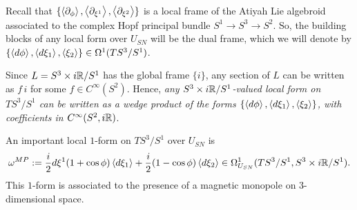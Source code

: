 \begin{example}
\label{exampleComplexHopfConnectionAndCurvature}
Recall that $\{\cl{\partial_\phi}, \cl{\partial_{\xi^1}}, \cl{\partial_{\xi^2}}\}$ is a local frame of the Atiyah Lie algebroid associated to the complex Hopf principal bundle $S^1 \to S^3 \to S^2$. So, the building blocks of any local form over $U_{SN}$ will be the dual frame, which we will denote by $\{\cl{d\phi}, \cl{d\xi_1}, \cl{\xi_2}\} \in \Omega^1(TS^3/S^1)$. 

\noindent Since $L = S^3 \times i\mathbb{R} / S^1$ has the global frame $\{i\}$, any section of $L$ can be written as $f\,i$ for some $f \in C^\infty(S^2)$. Hence, \textit{any $S^3 \times i\mathbb{R}/S^1$-valued local form on $TS^3/S^1$ can be written as a wedge product of the forms $\{\cl{d\phi}, \cl{d\xi_1}, \cl{\xi_2}\}$, with coefficients in $C^\infty(S^2, i\mathbb{R})$}.



\noindent An important local $1$-form on $TS^3/S^1$ over $U_{SN}$ is
\begin{equation}
    \lbtext{\omega^{MP}_{}} := \frac{i}{2} d\xi^1 (1 + \cos \phi) \cl{d \xi_1} + \frac{i}{2} (1- \cos\phi)\cl{d\xi_2} \in \Omega_{U_{SN}}^1(TS^3/S^1, S^3 \times i\RR/S^1).
\end{equation} This $1$-form is associated to the presence of a magnetic monopole on $3$-dimensional space.


\end{example}
